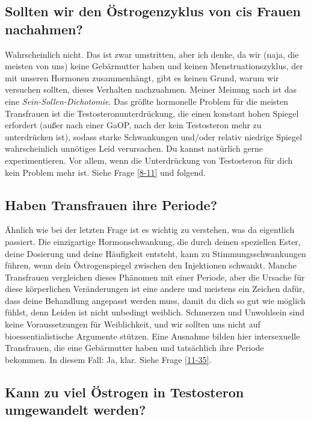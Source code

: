 \documentclass{article}
\begin{document}
{{{\subsection{Sollten wir den Östrogenzyklus von cis Frauen nachahmen?}\label{11-10}

Wahrscheinlich nicht. Das ist zwar umstritten, aber ich denke, da wir (naja, die meisten von uns) keine Gebärmutter haben und keinen Menstruationszyklus, der mit unseren Hormonen zusammenhängt, gibt es keinen Grund, warum wir versuchen sollten, dieses Verhalten nachzuahmen. Meiner Meinung nach ist das eine \textit{Sein-Sollen-Dichotomie}. Das größte hormonelle Problem für die meisten Transfrauen ist die Testosteronunterdrückung, die einen konstant hohen Spiegel erfordert (außer nach einer GaOP, nach der kein Testosteron mehr zu unterdrücken ist), sodass starke Schwankungen und/oder relativ niedrige Spiegel wahrscheinlich unnötiges Leid verursachen. Du kannst natürlich gerne experimentieren. Vor allem, wenn die Unterdrückung von Testosteron für dich kein Problem mehr ist. Siehe Frage \ref{8-11} und folgend.

\subsection{Haben Transfrauen ihre Periode?}

Ähnlich wie bei der letzten Frage ist es wichtig zu verstehen, was da eigentlich passiert. Die einzigartige Hormonschwankung, die durch deinen speziellen Ester, deine Dosierung und deine Häufigkeit entsteht, kann zu Stimmungsschwankungen führen, wenn dein Östrogenspiegel zwischen den Injektionen schwankt. Manche Transfrauen vergleichen dieses Phänomen mit einer Periode, aber die Ursache für diese körperlichen Veränderungen ist eine andere und meistens ein Zeichen dafür, dass deine Behandlung angepasst werden muss, damit du dich so gut wie möglich fühlst, denn Leiden ist nicht unbedingt weiblich. Schmerzen und Unwohlsein sind keine Voraussetzungen für Weiblichkeit, und wir sollten uns nicht auf bioessentialistische Argumente stützen. Eine Ausnahme bilden hier intersexuelle Transfrauen, die eine Gebärmutter haben und tatsächlich ihre Periode bekommen. In diesem Fall: Ja, klar. Siehe Frage \ref{11-35}.

\subsection{Kann zu viel Östrogen in Testosteron umgewandelt werden?}

}}}
\end{document}
